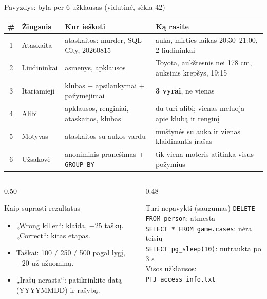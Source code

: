\documentclass[hyperref={breaklinks=true},fleqn,mathserif]{beamer}
\begin{document}
\begin{frame}{Pavyzdys: byla per 6 užklausas (vidutinė, sėkla 42)}

\scriptsize
\setlength{\tabcolsep}{3pt}
\begin{tabular}{@{}c>{\raggedright\arraybackslash}p{}>{\raggedright\arraybackslash}p{}>{\raggedright\arraybackslash}p{}@{}}
\toprule
\# & Žingsnis & Kur ieškoti & Ką rasite \\
\midrule
1 & Ataskaita & ataskaitos: murder, SQL City, 20260815 & auka, mirties laikas 20:30--21:00, 2 liudininkai \\
2 & Liudininkai & asmenys, apklausos & Toyota, aukštesnis nei 178 cm, auksinis krepšys, 19:15 \\
3 & Įtariamieji & klubas + apsilankymai + pažymėjimai & \textbf{3 vyrai}, ne vienas \\
4 & Alibi & apklausos, renginiai, ataskaitos, klubas & du turi alibi; vienas meluoja apie klubą ir renginį \\
5 & Motyvas & ataskaitos su aukos vardu & muštynės su auka ir vienas klaidinantis įrašas \\
6 & Užsakovė & anoniminis pranešimas + \texttt{GROUP BY} & tik viena moteris atitinka visus požymius \\
\bottomrule
\end{tabular}

\vspace{2mm}
\begin{columns}[T]
\begin{column}{0.50\textwidth}
\begin{block}{Kaip suprasti rezultatus}
\tiny
\begin{itemize}
    \setlength{\itemsep}{0pt}
    \item „Wrong killer“: klaida, $-25$ taškų. „Correct“: kitas etapas.
    \item Taškai: 100 / 250 / 500 pagal lygį, $-20$ už užuominą.
    \item „Įrašų nerasta“: patikrinkite datą (YYYYMMDD) ir rašybą.
\end{itemize}
\end{block}
\end{column}
\begin{column}{0.48\textwidth}
\begin{block}{Turi nepavykti (saugumas)}
\tiny
\texttt{DELETE FROM person}: atmesta\\
\texttt{SELECT * FROM game.cases}: nėra teisių\\
\texttt{SELECT pg\_sleep(10)}: nutraukta po 3 s\\[2pt]
Visos užklausos: \texttt{PTJ\_access\_info.txt}
\end{block}
\end{column}
\end{columns}

\end{frame}
\end{document}
